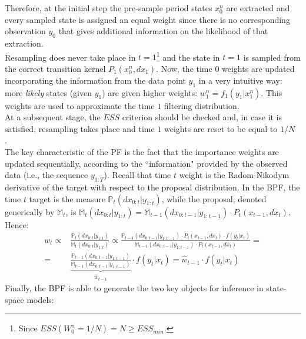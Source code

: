 \documentclass[
]{book}
\theoremstyle{break}
\theoremstyle{nonumberplain}
\begin{document}
Therefore, at the initial step the pre-sample period states \(x_0^n\)
are extracted and every sampled state is assigned an equal weight since
there is no corresponding observation \(y_0\) that gives additional
information on the likelihood of that extraction.\\
Resampling does never take place in
\(t=1\)\footnote{Since $ESS(W_0^n=1/N)=N\geq ESS_{min}$.} and the state
in \(t=1\) is sampled from the correct transition kernel
\(P_1(x_0^n,dx_1)\). Now, the time 0 weights are updated incorporating
the information from the data point \(y_1\) in a very intuitive way:
more \textit{likely} states (given \(y_1\)) are given higher weights:
\(w_1^n=f_1(y_1|x_1^n)\). This weights are used to approximate the time
\(1\) filtering distribution.\\
At a subsequent stage, the \(ESS\) criterion should be checked and, in
case it is satisfied, resampling takes place and time \(1\) weights are
reset to be equal to \(1/N\).~\\
The key characteristic of the PF is the fact that the importance weights
are updated sequentially, according to the ``information" provided by
the observed data (i.e., the sequence \(y_{1:T}\)). Recall that time
\(t\) weight is the Radom-Nikodym derivative of the target with respect
to the proposal distribution. In the BPF, the time \(t\) target is the
measure \(\mathbb P_t(dx_{0:t}|y_{1:t})\), while the proposal, denoted
generically by \(\mathbb M_t\), is
\(\mathbb M_t(dx_{0:t}|y_{1:t})=\mathbb M_{t-1}(dx_{0:t-1}|y_{1:t-1})\cdot P_t(x_{t-1},dx_t)\).
Hence: \begin{equation}
    \begin{split}
        w_t\propto&\frac{\mathbb P_t(dx_{0:t}|y_{1:t})}{\mathbb M_t(dx_{0:t}|y_{1:t})}\propto \frac{\mathbb P_{t-1}(dx_{0:t-1}|y_{1:t-1})\cdot P_t(x_{t-1},dx_t)\cdot f(y_t|x_t)}{\mathbb M_{t-1}(dx_{0:t-1}|y_{1:t-1})\cdot P_t(x_{t-1},dx_t)}=\\
        =&\underbrace{\frac{\mathbb P_{t-1}(dx_{0:t-1}|y_{1:t-1})}{\mathbb M_{t-1}(dx_{0:t-1}|y_{1:t-1})}}_{\hat w_{t-1}}\cdot f(y_t|x_t)=\hat w_{t-1}\cdot f(y_t|x_t)
    \end{split}\label{weight_updated_bpf}
\end{equation} Finally, the BPF is able to generate the two key objects
for inference in state-space models:
\end{document}
